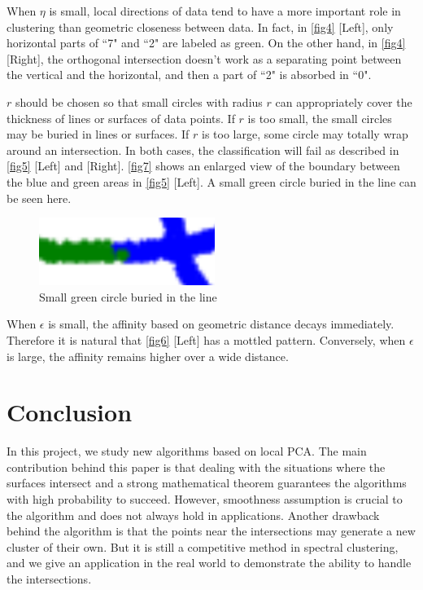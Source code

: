\documentclass{article}
\begin{document}
When $\eta$ is small, local directions of data tend to have a more important role in clustering than geometric closeness between data.
In fact, in \autoref{fig4} [Left], only horizontal parts of ``7" and ``2" are labeled as green.
On the other hand, in \autoref{fig4} [Right], the orthogonal intersection doesn't work as a separating point between the vertical and the horizontal, and then a part of ``2" is absorbed in ``0".

$r$ should be chosen so that small circles with radius $r$ can appropriately cover the thickness of lines or surfaces of data points.
If $r$ is too small, the small circles may be buried in lines or surfaces.
If $r$ is too large, some circle may totally wrap around an intersection.
In both cases, the classification will fail as described in \autoref{fig5} [Left] and [Right].
\autoref{fig7} shows an enlarged view of the boundary between the blue and green areas in \autoref{fig5} [Left].
A small green circle buried in the line can be seen here.

\begin{figure}[htbp]
\centering
\includegraphics[width=0.3  \textwidth]{boundary.png}
\caption{Small green circle buried in the line}
\label{fig7}
\end{figure}

When $\epsilon$ is small, the affinity based on geometric distance decays immediately.
Therefore it is natural that \autoref{fig6} [Left] has a mottled pattern.
Conversely, when $\epsilon$ is large, the affinity remains higher over a wide distance.



\section{Conclusion}
In this project, we study new algorithms based on local PCA.
The main contribution behind this paper is that dealing with the situations where the surfaces intersect and a strong mathematical theorem guarantees the algorithms with high probability to succeed.
However, smoothness assumption is crucial to the algorithm and does not always hold in applications.
Another drawback behind the algorithm is that the points near the intersections may generate a new cluster of their own.
But it is still a competitive method in spectral clustering, and we give an application in the real world to demonstrate the ability to handle the intersections.
\end{document}
